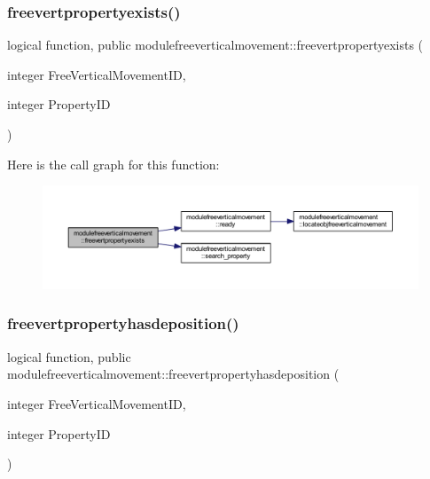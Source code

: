\subsubsection{\texorpdfstring{freevertpropertyexists()}{freevertpropertyexists()}}
{\footnotesize\ttfamily logical function, public modulefreeverticalmovement\+::freevertpropertyexists (\begin{DoxyParamCaption}\item[{integer}]{Free\+Vertical\+Movement\+ID,  }\item[{integer}]{Property\+ID }\end{DoxyParamCaption})}

Here is the call graph for this function\+:\nopagebreak
\begin{figure}[H]
\begin{center}
\leavevmode
\includegraphics[width=350pt]{namespacemodulefreeverticalmovement_abe59234b027e4daf4dad54daa42f5438_cgraph}
\end{center}
\end{figure}
\mbox{\label{namespacemodulefreeverticalmovement_a5df00d9a684664131c8c007872e866a8}} 
\subsubsection{\texorpdfstring{freevertpropertyhasdeposition()}{freevertpropertyhasdeposition()}}
{\footnotesize\ttfamily logical function, public modulefreeverticalmovement\+::freevertpropertyhasdeposition (\begin{DoxyParamCaption}\item[{integer}]{Free\+Vertical\+Movement\+ID,  }\item[{integer}]{Property\+ID }\end{DoxyParamCaption})}

